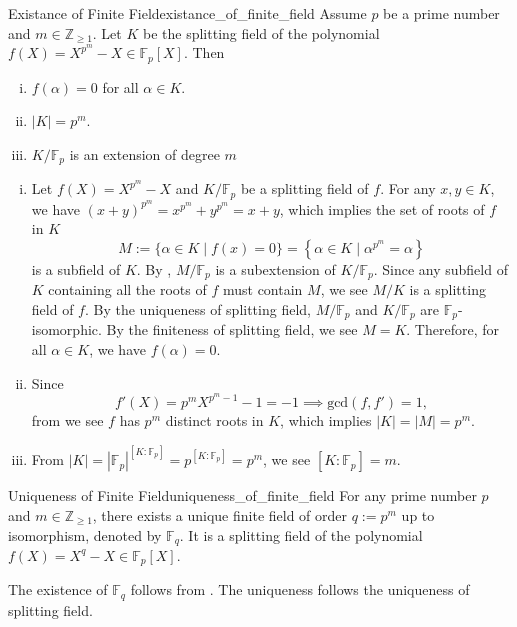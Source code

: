 \begin{lemma}{Existance of Finite Field}{existance_of_finite_field}
    Assume $p$ be a prime number and $m\in\mathbb{Z}_{\ge1}$. Let $K$ be the splitting field of the polynomial $f(X)=X^{p^m}-X\in \mathbb{F}_p[X]$. Then 
    \begin{enumerate}[(i)]
        \item $f(\alpha)=0$ for all $\alpha\in K$.
        \item $|K|=p^m$.
        \item $K/\mathbb{F}_p$ is an extension of degree $m$ 
        
    \end{enumerate}
\end{lemma}
\begin{prf}
    \begin{enumerate}[(i)]
        \item Let $f(X)=X^{p^m}-X$ and $K/\mathbb{F}_p$ be a splitting field of $f$. For any $x,y\in K$, we have $(x+y)^{p^m}=x^{p^m}+y^{p^m}=x+y$, which implies the set of roots of $f$ in $K$
        \[
        M:=\{\alpha\in K\mid f(x)=0\}=\left\{\alpha\in K\mid \alpha^{p^m}=\alpha\right\}
        \]
        is a subfield of $K$. By , $M/\mathbb{F}_p$ is a subextension of $K/\mathbb{F}_p$. Since any subfield of $K$ containing all the roots of $f$ must contain $M$, we see $M/K$ is a splitting field of $f$. By the uniqueness of splitting field, $M/\mathbb{F}_p$ and $K/\mathbb{F}_p$ are $\mathbb{F}_p$-isomorphic. By the finiteness of splitting field, we see $M=K$. Therefore, for all $\alpha\in K$, we have $f(\alpha)=0$.
        \item Since
        \[
        f'(X)=p^mX^{p^m-1}-1=-1\implies \mathrm{gcd}(f,f')=1,
        \]
        from  we see $f$ has $p^m$ distinct roots in $K$, which implies $|K|=|M|=p^m$. 
        \item From $|K|=|\mathbb{F}_p|^{[K:\mathbb{F}_p]}=p^{[K:\mathbb{F}_p]}=p^m$, we see $[K:\mathbb{F}_p]=m$.
    \end{enumerate}
  
\end{prf}

\begin{proposition}{Uniqueness of Finite Field}{uniqueness_of_finite_field}
For any prime number $p$ and $m\in\mathbb{Z}_{\ge1}$, there exists a unique finite field of order $q:=p^m$ up to isomorphism, denoted by $\mathbb{F}_{q}$. It is a splitting field of the polynomial $f(X)=X^{q}-X\in \mathbb{F}_p[X]$.
\end{proposition}
\begin{prf}
    The existence of $\mathbb{F}_{q}$ follows from . The uniqueness follows the uniqueness of splitting field.
\end{prf}


